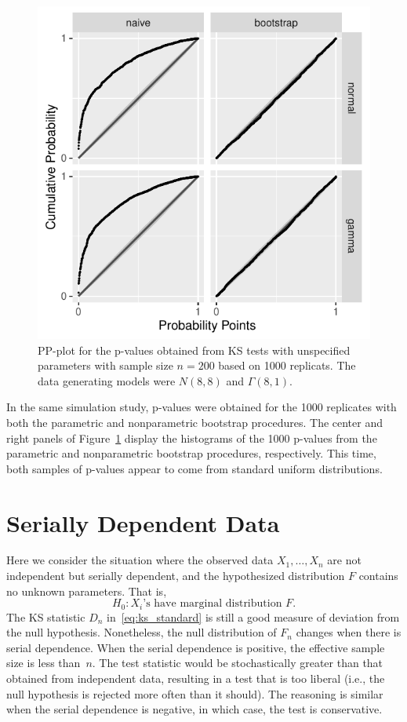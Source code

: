 \documentclass[12pt, letterpaper, titlepage]{article}
\begin{document}
\begin{figure}[tbp]
  \centering
  \includegraphics[width=.5\textwidth]{pp_f.pdf}
  \caption{PP-plot for the p-values obtained from KS tests with unspecified
    parameters with sample size $n = 200$ based on 1000 replicats. The data
    generating models were $N(8, 8)$ and $\Gamma(8, 1)$.
  }
  \label{fig:pp_f}
\end{figure}


In the same simulation study, p-values were obtained for the 1000 replicates
with both the parametric and nonparametric bootstrap procedures. The center and
right panels of Figure~\ref{fig:pp_f} display the histograms of the 1000
p-values from the parametric and nonparametric bootstrap procedures,
respectively. This time, both samples of p-values appear to come from
standard uniform distributions.

\section{Serially Dependent Data}
\label{sec:dependence}

Here we consider the situation where the observed data $X_1, \ldots, X_n$ are
not independent but serially dependent, and the hypothesized distribution $F$
contains no unknown parameters. That is,
\[
H_0: \text{$X_i$'s have marginal distribution $F$.}
\]
The KS statistic $D_n$ in~\eqref{eq:ks_standard}
is still a good measure of deviation from the null hypothesis. Nonetheless, the
null distribution of $F_n$ changes when there is serial dependence.
When the serial dependence is
positive, the effective sample size is less than~$n$. The test statistic
would be stochastically greater than that obtained from independent data, 
resulting in a test that is too liberal (i.e., the null hypothesis is rejected
more often than it should). The reasoning is similar when the serial dependence 
is negative, in which case, the test is conservative.
\end{document}
